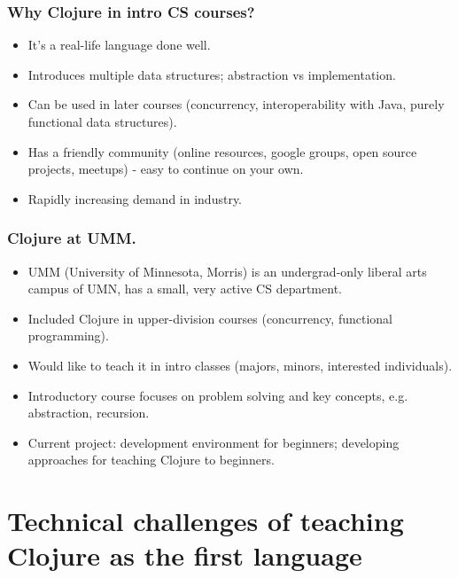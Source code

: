 \documentclass{beamer}
\begin{document}
\begin{frame}
\frametitle{Why Clojure in intro CS courses?}
\begin{itemize}
\item It's a real-life language done well. 
\item Introduces multiple data structures; abstraction vs implementation. 
\item Can be used in later courses  (concurrency, interoperability with Java, purely functional data structures). 
\item Has a friendly community (online resources, google groups, open source projects, meetups) - easy to continue on your own. 
\item Rapidly increasing demand in industry. 
\end{itemize}
\end{frame}

\begin{frame}
\frametitle{Clojure at UMM.}
\begin{itemize}
\item UMM (University of Minnesota, Morris) is an undergrad-only liberal arts campus of UMN, has a small, very active CS department. 
\item Included Clojure in upper-division courses (concurrency, functional programming). 
\item Would like to teach it in intro classes (majors, minors, interested individuals).
\item Introductory course focuses on problem solving and key concepts, e.g. abstraction, recursion.
\item Current project: development environment for beginners; developing approaches for teaching Clojure to beginners. 
\end{itemize}
\end{frame}

\section{Technical challenges of teaching Clojure as the first language}
\end{document}
